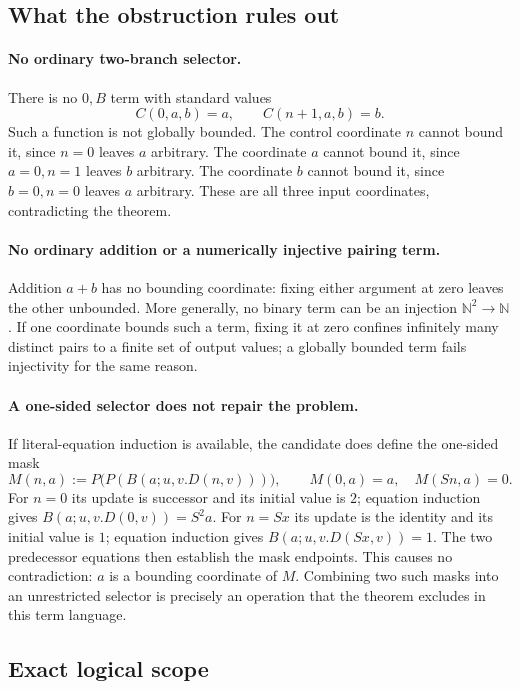 \subsection{What the obstruction rules out}

\paragraph{No ordinary two-branch selector.}
There is no $0,B$ term with standard values
\[
 C(0,a,b)=a,\qquad C(n+1,a,b)=b.
\]
Such a function is not globally bounded.  The control coordinate $n$
cannot bound it, since $n=0$ leaves $a$ arbitrary.  The coordinate $a$
cannot bound it, since $a=0,n=1$ leaves $b$ arbitrary.  The coordinate
$b$ cannot bound it, since $b=0,n=0$ leaves $a$ arbitrary.  These are
all three input coordinates, contradicting the theorem.

\paragraph{No ordinary addition or a numerically injective pairing term.}
Addition $a+b$ has no bounding coordinate: fixing either argument at zero
leaves the other unbounded.  More generally, no binary term can be an
injection $\mathbb N^2\to\mathbb N$.  If one coordinate bounds such a
term, fixing it at zero confines infinitely many distinct pairs to a
finite set of output values; a globally bounded term fails injectivity
for the same reason.

\paragraph{A one-sided selector does not repair the problem.}
If literal-equation induction is available, the candidate does define
the one-sided mask
\[
 M(n,a):=P\bigl(P(B(a;u,v.D(n,v)))\bigr),
\qquad
 M(0,a)=a,\quad M(Sn,a)=0.
\]
For $n=0$ its update is successor and its initial value is $2$;
equation induction gives $B(a;u,v.D(0,v))=S^2a$.
For $n=Sx$ its update is the identity and its initial value is $1$;
equation induction gives $B(a;u,v.D(Sx,v))=1$.
The two predecessor equations then establish the mask endpoints.
This causes no contradiction: $a$ is a bounding coordinate of $M$.
Combining two such masks into an unrestricted selector is precisely an
operation that the theorem excludes in this term language.

\subsection{Exact logical scope}

